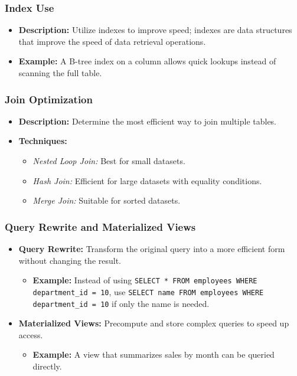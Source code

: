 \documentclass[aspectratio=169]{beamer}
\begin{document}
\begin{frame}[fragile]
    \frametitle{Index Use}
    \begin{itemize}
        \item \textbf{Description:} Utilize indexes to improve speed; indexes are data structures that improve the speed of data retrieval operations.
        \item \textbf{Example:} A B-tree index on a column allows quick lookups instead of scanning the full table.
    \end{itemize}
\end{frame}

\begin{frame}[fragile]
    \frametitle{Join Optimization}
    \begin{itemize}
        \item \textbf{Description:} Determine the most efficient way to join multiple tables.
        \item \textbf{Techniques:} 
        \begin{itemize}
            \item \textit{Nested Loop Join:} Best for small datasets.
            \item \textit{Hash Join:} Efficient for large datasets with equality conditions.
            \item \textit{Merge Join:} Suitable for sorted datasets.
        \end{itemize}
    \end{itemize}
\end{frame}

\begin{frame}[fragile]
    \frametitle{Query Rewrite and Materialized Views}
    \begin{itemize}
        \item \textbf{Query Rewrite:} Transform the original query into a more efficient form without changing the result.
            \begin{itemize}
                \item \textbf{Example:} Instead of using \texttt{SELECT * FROM employees WHERE department\_id = 10}, use \texttt{SELECT name FROM employees WHERE department\_id = 10} if only the name is needed.
            \end{itemize}
        \item \textbf{Materialized Views:} Precompute and store complex queries to speed up access.
            \begin{itemize}
                \item \textbf{Example:} A view that summarizes sales by month can be queried directly.
            \end{itemize}
    \end{itemize}
\end{frame}
\end{document}

